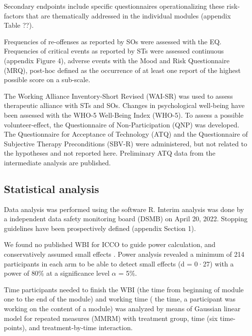 \documentclass[
  super,
  preprint,
  1p,
  onecolumn]{elsarticle}
\begin{document}
Secondary endpoints include specific questionnaires operationalizing
these risk-factors that are thematically addressed in the individual
modules (appendix Table ??).

Frequencies of re-offenses as reported by SOs were assessed with the EQ.
Frequencies of critical events as reported by STs were assessed
continuous (appendix Figure 4), adverse events with the Mood and Risk
Questionnaire (MRQ), post-hoc defined as the occurrence of at least one
report of the highest possible score on a sub-scale.

The Working Alliance Inventory-Short Revised (WAI-SR) was used to assess
therapeutic alliance with STs and SOs. Changes in psychological
well-being have been assessed with the WHO-5 Well-Being Index (WHO-5).
To assess a possible volunteer-effect, the Questionnaire of
Non-Participation (QNP) was developed. The Questionnaire for Acceptance
of Technology (ATQ) and the Questionnaire of Subjective Therapy
Preconditions (SBV-R) were administered, but not related to the
hypotheses and not reported here. Preliminary ATQ data from the
intermediate analysis are published.
\citep{schroderAcceptanceWebBasedIntervention2024, schroderEngagementWebbasedIntervention2025}

\subsection{Statistical analysis}\label{statistical-analysis}

Data analysis was performed using the software R.
\citep{rcoreteamLanguageEnvironmentStatistical2025} Interim analysis was
done by a independent data safety monitoring board (DSMB) on April 20,
2022. Stopping guidelines have been prospectively defined (appendix
Section 1).

We found no published WBI for ICCO to guide power calculation, and
conservatively assumed small effects . Power analysis revealed a minimum
of 214 participants in each arm to be able to detect small effects (d =
0·27) with a power of 80\% at a significance level \(\alpha\) = 5\%.

Time participants needed to finish the WBI (the time from beginning of
module one to the end of the module) and working time ( the time, a
participant was working on the content of a module) was analyzed by
means of Gaussian linear model for repeated measures (MMRM) with
treatment group, time (six time-points), and treatment-by-time
interaction.
\end{document}
